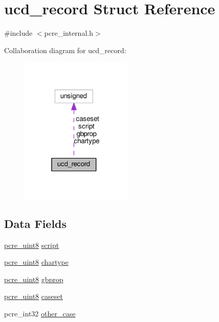 \hypertarget{structucd__record}{}\section{ucd\+\_\+record Struct Reference}
\label{structucd__record}


{\ttfamily \#include $<$pcre\+\_\+internal.\+h$>$}



Collaboration diagram for ucd\+\_\+record\+:
\nopagebreak
\begin{figure}[H]
\begin{center}
\leavevmode
\includegraphics[width=151pt]{structucd__record__coll__graph}
\end{center}
\end{figure}
\subsection*{Data Fields}
\begin{DoxyCompactItemize}
\item 
\hyperlink{pcre__internal_8h_a6e9105ffeed09883190f9bf30d93e210}{pcre\+\_\+uint8} \hyperlink{structucd__record_a4363c8b68c5cc27747c4164a41c90c39}{script}
\item 
\hyperlink{pcre__internal_8h_a6e9105ffeed09883190f9bf30d93e210}{pcre\+\_\+uint8} \hyperlink{structucd__record_a176525b7560df127b5569c59b1a78e2d}{chartype}
\item 
\hyperlink{pcre__internal_8h_a6e9105ffeed09883190f9bf30d93e210}{pcre\+\_\+uint8} \hyperlink{structucd__record_a59efec089c341aa727512b2a4aa58ff5}{gbprop}
\item 
\hyperlink{pcre__internal_8h_a6e9105ffeed09883190f9bf30d93e210}{pcre\+\_\+uint8} \hyperlink{structucd__record_a020bc2c950fc09e16c6df4e0c5583fce}{caseset}
\item 
pcre\+\_\+int32 \hyperlink{structucd__record_a66ff6ecee7b043aaad9e5a6f4b7c7898}{other\+\_\+case}
\end{DoxyCompactItemize}


